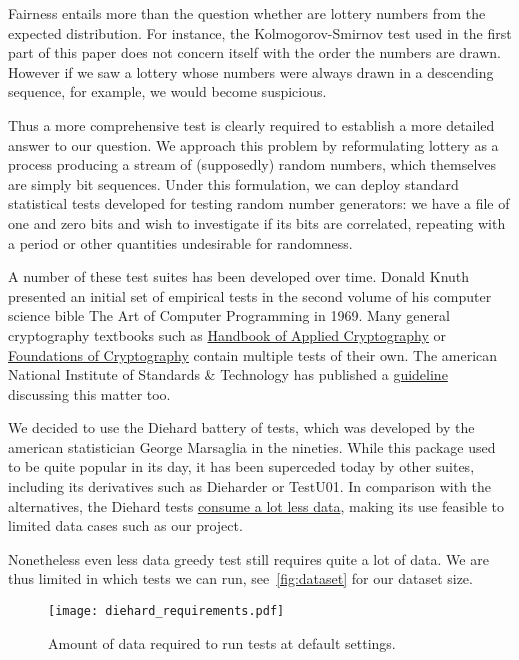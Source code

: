 Fairness entails more than the question whether are lottery numbers from the expected distribution. For instance, the Kolmogorov-Smirnov
test used in the first part of this paper does not concern itself with the order the numbers are drawn. However if we saw a lottery whose
numbers were always drawn in a descending sequence, for example, we would become suspicious.

Thus a more comprehensive test is clearly required to establish a more detailed answer to our question. We approach this problem by reformulating
lottery as a process producing a stream of (supposedly) random numbers, which themselves are simply bit sequences. Under this formulation,
we can deploy standard statistical tests developed for testing random number generators: we have a file of one and zero bits and wish to investigate
if its bits are correlated, repeating with a period or other quantities undesirable for randomness.

A number of these test suites has been developed over time. Donald Knuth presented an initial set of empirical tests in the second volume of his computer science bible
The Art of Computer Programming in 1969. Many general cryptography textbooks such as \href{http://www.cacr.math.uwaterloo.ca/hac/}{Handbook of Applied Cryptography} 
or \href{http://www.wisdom.weizmann.ac.il/~oded/foc-vol1.html}{Foundations of Cryptography} contain multiple tests of their own. The american National Institute 
of Standards \& Technology has published a \href{https://nvlpubs.nist.gov/nistpubs/legacy/sp/nistspecialpublication800-22r1a.pdf}{guideline} discussing this matter too.

We decided to use the Diehard battery of tests, which was developed by the american statistician George Marsaglia in the nineties. While this package used
to be quite popular in its day, it has been superceded today by other suites, including its derivatives such as Dieharder or TestU01. In comparison with the alternatives,
the Diehard tests \href{https://crypto.stackexchange.com/questions/90076/how-to-compute-the-dataset-size-required-by-dieharder-tests}{consume a lot less data}, making
its use feasible to limited data cases such as our project.

Nonetheless even less data greedy test still requires quite a lot of data. We are thus limited in which tests we can run, see~\ref{fig:dataset} for our dataset size.

\begin{figure}
    \centering
    \texttt{[image: diehard\_requirements.pdf]}
    \caption{Amount of data required to run tests at default settings.}
    \label{fig:requirements}
\end{figure}

